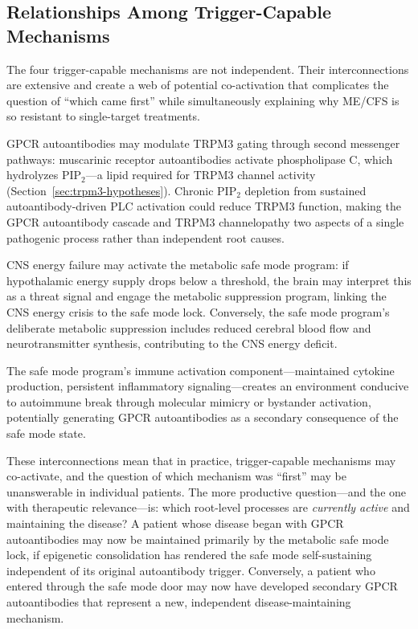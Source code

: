 \subsection{Relationships Among Trigger-Capable Mechanisms}
\label{sec:root-cause-relationships}

The four trigger-capable mechanisms are not independent. Their interconnections are extensive and create a web of potential co-activation that complicates the question of ``which came first'' while simultaneously explaining why ME/CFS is so resistant to single-target treatments.

GPCR autoantibodies may modulate TRPM3 gating through second messenger pathways: muscarinic receptor autoantibodies activate phospholipase C, which hydrolyzes PIP$_2$---a lipid required for TRPM3 channel activity (Section~\ref{sec:trpm3-hypotheses}). Chronic PIP$_2$ depletion from sustained autoantibody-driven PLC activation could reduce TRPM3 function, making the GPCR autoantibody cascade and TRPM3 channelopathy two aspects of a single pathogenic process rather than independent root causes.

CNS energy failure may activate the metabolic safe mode program: if hypothalamic energy supply drops below a threshold, the brain may interpret this as a threat signal and engage the metabolic suppression program, linking the CNS energy crisis to the safe mode lock. Conversely, the safe mode program's deliberate metabolic suppression includes reduced cerebral blood flow and neurotransmitter synthesis, contributing to the CNS energy deficit.

The safe mode program's immune activation component---maintained cytokine production, persistent inflammatory signaling---creates an environment conducive to autoimmune break through molecular mimicry or bystander activation, potentially generating GPCR autoantibodies as a secondary consequence of the safe mode state.

These interconnections mean that in practice, trigger-capable mechanisms may co-activate, and the question of which mechanism was ``first'' may be unanswerable in individual patients. The more productive question---and the one with therapeutic relevance---is: which root-level processes are \emph{currently active} and maintaining the disease? A patient whose disease began with GPCR autoantibodies may now be maintained primarily by the metabolic safe mode lock, if epigenetic consolidation has rendered the safe mode self-sustaining independent of its original autoantibody trigger. Conversely, a patient who entered through the safe mode door may now have developed secondary GPCR autoantibodies that represent a new, independent disease-maintaining mechanism.

